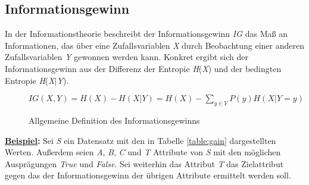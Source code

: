 \subsection{Informationsgewinn}
\label{id3:gain}
In der Informationstheorie beschreibt der Informationsgewinn \textit{IG} das Maß an Informationen, das über eine Zufallsvariablen \textit{X} durch Beobachtung einer anderen Zufallsvariablen \textit{Y} gewonnen werden kann. \autocite{DataMining} Konkret ergibt sich der Informationsgewinn aus der Differenz der Entropie \textit{H}(\textit{X}) und der bedingten Entropie \textit{H}(\textit{X}$\vert$\textit{Y}). \autocites{DataMining}{Informat29:online}{QuinlanID3}

\begin{figure}[H]
    \label{fig:gain}
    \vspace{0.5cm}
    \centering
        $ IG(X,Y) = H(X) - H(X\vert Y) = H(X) - \sum\limits_{y\in Y} P(y)H(X\vert Y=y)$
    \caption{Allgemeine Definition des Informationsgewinns \autocites{DataMining}{ConditionalEntropy}}
\end{figure}

\textbf{\underline{Beispiel}:} Sei \textit{S} ein Datensatz mit den in Tabelle \ref{table:gain} dargestellten Werten. Außerdem seien \textit{A}, \textit{B}, \textit{C} und \textit{T} Attribute von \textit{S} mit den möglichen Ausprägungen \textit{True} und \textit{False}. Sei weiterhin das Attribut \textit{T} das Zielattribut gegen das der Informationsgewinn der übrigen Attribute ermittelt werden soll.

